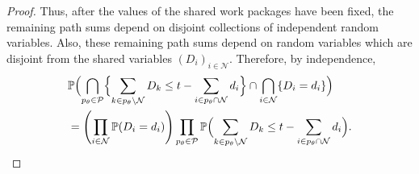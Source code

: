\documentclass[11pt,a4paper]{article}
\newcommand{\pP}{\mathbb{P}}
\newcommand{\1}{\mathbf{1}}
\theoremstyle{definition}
\theoremstyle{plain}
\theoremstyle{remark}
\numberwithin{equation}{section}
\begin{document}
\begin{proof}
Thus, after the values of the shared work packages have been fixed, the remaining path sums depend on disjoint collections of independent random variables. Also, these remaining path sums depend on random variables which are disjoint from the shared variables $(D_i)_{i\in\mathcal{N}}$. Therefore, by independence,
\[
\begin{aligned}
&\pP \Bigl(
\bigcap_{p_\theta \in \mathcal{P}}
\Bigl\{
\sum_{k \in p_\theta\setminus\mathcal{N}}D_k
\leq
t-\sum_{i \in p_\theta\cap\mathcal{N}}d_i
\Bigr\}
\cap
\bigcap_{i \in \mathcal{N}}
\{D_i=d_i\}
\Bigr)
\\
&=
\left(
\prod_{i \in \mathcal{N}}
\pP(D_i=d_i)
\right)
\prod_{p_\theta \in \mathcal{P}}
\pP \Bigl(
\sum_{k \in p_\theta\setminus\mathcal{N}}D_k
\leq
t-\sum_{i \in p_\theta\cap\mathcal{N}}d_i
\Bigr).
\end{aligned}
\]


\end{proof}
\end{document}
